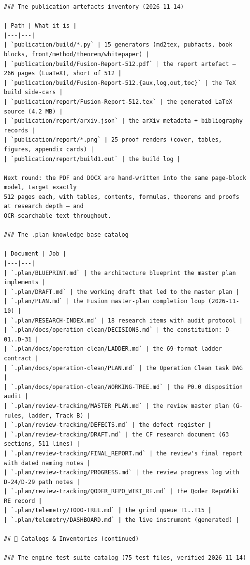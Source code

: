 \begin{Verbatim}[breaklines,breakanywhere,fontsize=\footnotesize]
### The publication artefacts inventory (2026-11-14)

| Path | What it is |
|---|---|
| `publication/build/*.py` | 15 generators (md2tex, pubfacts, book blocks, front/method/theorem/whitepaper) |
| `publication/build/Fusion-Report-512.pdf` | the report artefact — 266 pages (LuaTeX), short of 512 |
| `publication/build/Fusion-Report-512.{aux,log,out,toc}` | the TeX build side-cars |
| `publication/report/Fusion-Report-512.tex` | the generated LaTeX source (4.2 MB) |
| `publication/report/arxiv.json` | the arXiv metadata + bibliography records |
| `publication/report/*.png` | 25 proof renders (cover, tables, figures, appendix cards) |
| `publication/report/build1.out` | the build log |

Next round: the PDF and DOCX are hand-written into the same page-block model, target exactly
512 pages each, with tables, contents, formulas, theorems and proofs at research depth — and
OCR-searchable text throughout.

### The .plan knowledge-base catalog

| Document | Job |
|---|---|
| `.plan/BLUEPRINT.md` | the architecture blueprint the master plan implements |
| `.plan/DRAFT.md` | the working draft that led to the master plan |
| `.plan/PLAN.md` | the Fusion master-plan completion loop (2026-11-10) |
| `.plan/RESEARCH-INDEX.md` | 18 research items with audit protocol |
| `.plan/docs/operation-clean/DECISIONS.md` | the constitution: D-01..D-31 |
| `.plan/docs/operation-clean/LADDER.md` | the 69-format ladder contract |
| `.plan/docs/operation-clean/PLAN.md` | the Operation Clean task DAG |
| `.plan/docs/operation-clean/WORKING-TREE.md` | the P0.0 disposition audit |
| `.plan/review-tracking/MASTER_PLAN.md` | the review master plan (G-rules, ladder, Track B) |
| `.plan/review-tracking/DEFECTS.md` | the defect register |
| `.plan/review-tracking/DRAFT.md` | the CF research document (63 sections, 511 lines) |
| `.plan/review-tracking/FINAL_REPORT.md` | the review's final report with dated naming notes |
| `.plan/review-tracking/PROGRESS.md` | the review progress log with D-24/D-29 path notes |
| `.plan/review-tracking/QODER_REPO_WIKI_RE.md` | the Qoder RepoWiki RE record |
| `.plan/telemetry/TODO-TREE.md` | the grind queue T1..T15 |
| `.plan/telemetry/DASHBOARD.md` | the live instrument (generated) |

## 🧩 Catalogs & Inventories (continued)

### The engine test suite catalog (75 test files, verified 2026-11-14)


\end{Verbatim}
